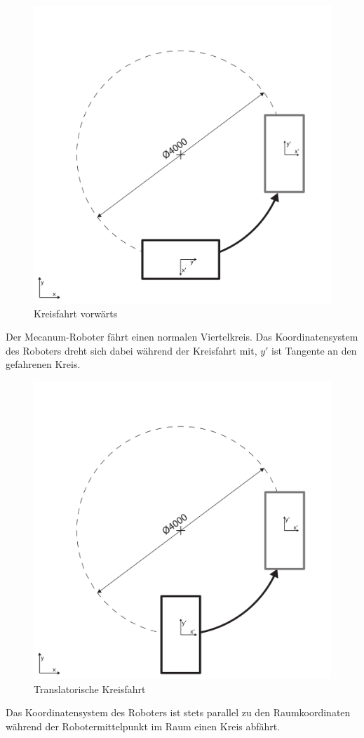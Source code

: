 \documentclass[a4paper]{article}
\begin{document}
\begin{figure}[H]
    \centering
    \includegraphics[width=.6\textwidth]{Abbildungen/Viertelkreis-vorwaerts}
    \caption{Kreisfahrt vorwärts}
    \label{fig:kreis-vorwaerts}
\end{figure}
Der Mecanum-Roboter fährt einen normalen Viertelkreis. Das Koordinatensystem des Roboters dreht sich dabei während der Kreisfahrt mit, $y'$ ist Tangente an den gefahrenen Kreis.

\begin{figure}[H]
    \centering
    \includegraphics[width=.6\textwidth]{Abbildungen/Viertelkreis-translatorisch}
    \caption{Translatorische Kreisfahrt}
    \label{fig:kreis-translatorisch}
\end{figure}
Das Koordinatensystem des Roboters ist stets parallel zu den Raumkoordinaten während der Robotermittelpunkt im Raum einen Kreis abfährt.
\end{document}
